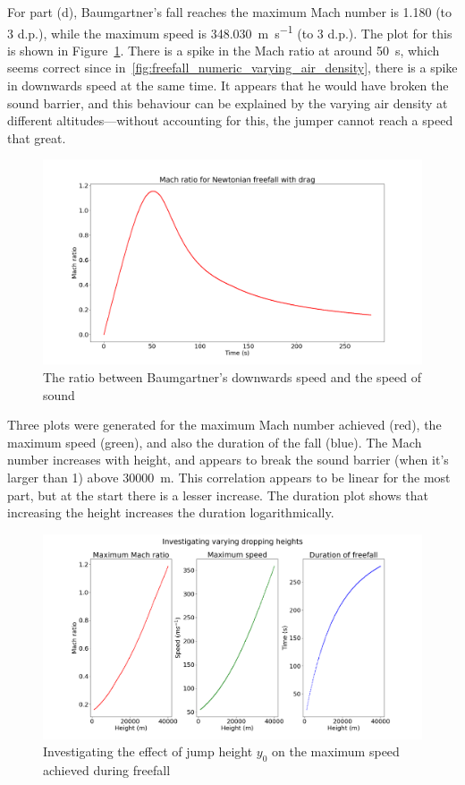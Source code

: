 \documentclass[hyphens,twocolumn,nobalancelastpage,aps,10pt,citeautoscript,longbibliography]{revtex4-2}
\begin{document}
For part (d), Baumgartner's fall reaches the maximum Mach number is 1.180 (to 3
d.p.), while the maximum speed is \qty{348.030}{\metre\per\second} (to 3 d.p.).
The plot for this is shown in Figure~\ref{fig:mach_ratio}. There is a spike in
the Mach ratio at around \qty{50}{\second}, which seems correct since
in~\ref{fig:freefall_numeric_varying_air_density}, there is a spike in
downwards speed at the same time. It appears that he would have broken the
sound barrier, and this behaviour can be explained by the varying air density
at different altitudes---without accounting for this, the jumper cannot reach a
speed that great.
\begin{figure}[htpb]
	\centering
	\includegraphics[width=1\linewidth]{mach_ratio.png}
	\caption{The ratio between Baumgartner's downwards speed and the speed of sound}%
	\label{fig:mach_ratio}
\end{figure}

Three plots were generated for the maximum Mach number achieved (red), the maximum
speed (green), and also the duration of the fall (blue). The Mach number
increases with height, and appears to break the sound barrier (when it's larger
than 1) above \qty{30000}{\metre}. This correlation appears to be linear for
the most part, but at the start there is a lesser increase. The duration plot
shows that increasing the height increases the duration logarithmically.
\begin{figure}[htpb]
	\centering
	\includegraphics[width=\linewidth]{jump_height.png}
	\caption{Investigating the effect of jump height $y_0$ on the maximum speed achieved during freefall}%
	\label{fig:jump_height}
\end{figure}
\end{document}
